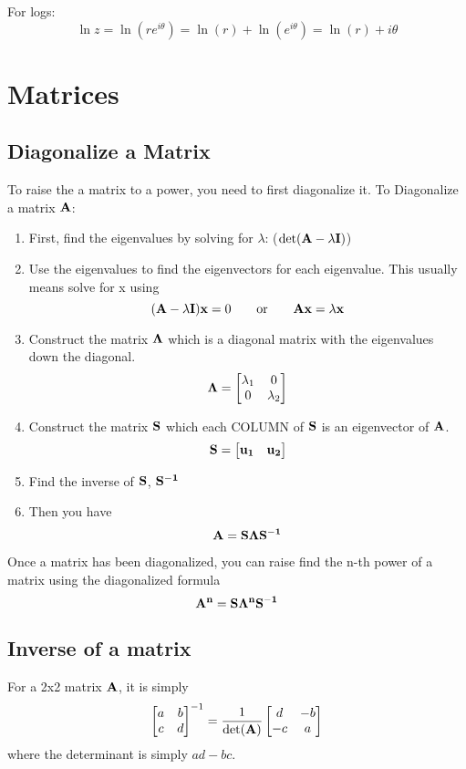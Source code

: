 \documentclass{article}
\begin{document}
For logs:
$$
\ln z = \ln(re^{i\theta}) = \ln(r) +  \ln(e^{i\theta}) = \ln(r) + i\theta
$$

\section{Matrices}
\subsection{Diagonalize a Matrix}
To raise the a matrix to a power, you need to first diagonalize it. To Diagonalize a matrix $\vb{A}$:

\begin{enumerate}
    \item First, find the eigenvalues by solving for $\lambda$: ($\det(\vb{A}-\lambda \vb{I})$)
    \item Use the eigenvalues to find the eigenvectors for each eigenvalue.  This usually means solve for x using
    $$
    (\vb{A} - \lambda \vb{I})\vb{x} = 0 \qquad \text{or} \qquad \vb{A}\vb{x} = \lambda \vb{x}
    $$
    \item Construct the matrix $\vb{\Lambda}$ which is a diagonal matrix with the eigenvalues down the diagonal.
    $$
    \vb{\Lambda} = 
        \begin{bmatrix}
        \lambda_1 & 0 \\
        0 & \lambda_2
        \end{bmatrix}
    $$
    \item Construct the matrix $\vb{S}$ which each COLUMN of $\vb{S}$ is an eigenvector of $\vb{A}$.
    $$
    \vb{S} = 
        \begin{bmatrix}
        \vb{u_1} &
        \vb{u_2}
        \end{bmatrix}
    $$
    \item Find the inverse of $\vb{S}$, $\vb{S^{-1}}$
    \item Then you have
    $$
    \vb{A} = \vb{S}\vb{\Lambda}{\vb{S^{-1}}}
    $$
\end{enumerate}

Once a matrix has been diagonalized, you can raise find the n-th power of a matrix using the diagonalized formula
$$
\vb{A^n} = \vb{S}\vb{\Lambda^n}{\vb{S^{-1}}}
$$

\subsection{Inverse of a matrix}
For a 2x2 matrix $\vb{A}$, it is simply
$$
\begin{bmatrix}
a & b \\
c & d
\end{bmatrix}^{-1}
 = 
 \frac{1}{\det(\vb{A})}
\begin{bmatrix}
d & -b \\
-c & a
\end{bmatrix}
$$
where the determinant is simply $ad-bc$. 
\end{document}
